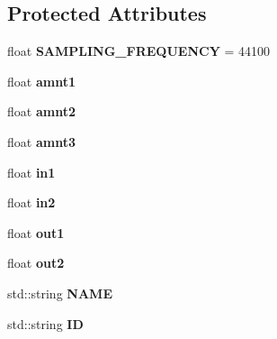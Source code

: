 \subsection*{Protected Attributes}
\begin{DoxyCompactItemize}
\item 
float {\bfseries S\+A\+M\+P\+L\+I\+N\+G\+\_\+\+F\+R\+E\+Q\+U\+E\+N\+CY} = 44100\hypertarget{classunit_1_1UGen_af570ad383b680b2c79209b6ab28d010d}{}\label{classunit_1_1UGen_af570ad383b680b2c79209b6ab28d010d}

\item 
float {\bfseries amnt1}\hypertarget{classunit_1_1UGen_a4691cf88e3711c22617c11fc3ea3848e}{}\label{classunit_1_1UGen_a4691cf88e3711c22617c11fc3ea3848e}

\item 
float {\bfseries amnt2}\hypertarget{classunit_1_1UGen_a5e71a2e764029b4909c7e8535922e4b3}{}\label{classunit_1_1UGen_a5e71a2e764029b4909c7e8535922e4b3}

\item 
float {\bfseries amnt3}\hypertarget{classunit_1_1UGen_a14ebb8261a700f961c2d7808609470fe}{}\label{classunit_1_1UGen_a14ebb8261a700f961c2d7808609470fe}

\item 
float {\bfseries in1}\hypertarget{classunit_1_1UGen_aaf1873ae9668c6f1b37cae635bd40037}{}\label{classunit_1_1UGen_aaf1873ae9668c6f1b37cae635bd40037}

\item 
float {\bfseries in2}\hypertarget{classunit_1_1UGen_aed559bb431c46fe308560bd81756d169}{}\label{classunit_1_1UGen_aed559bb431c46fe308560bd81756d169}

\item 
float {\bfseries out1}\hypertarget{classunit_1_1UGen_a90ba3b9008a6d8386035db3dee502217}{}\label{classunit_1_1UGen_a90ba3b9008a6d8386035db3dee502217}

\item 
float {\bfseries out2}\hypertarget{classunit_1_1UGen_a779961bf3971a9f4c85d292dbb6d6d78}{}\label{classunit_1_1UGen_a779961bf3971a9f4c85d292dbb6d6d78}

\item 
std\+::string {\bfseries N\+A\+ME}\hypertarget{classunit_1_1UGen_ae468f7e763da88da4389b8bdbc306459}{}\label{classunit_1_1UGen_ae468f7e763da88da4389b8bdbc306459}

\item 
std\+::string {\bfseries ID}\hypertarget{classunit_1_1UGen_ab8d5acd179e175cc787ac43a49b68c29}{}\label{classunit_1_1UGen_ab8d5acd179e175cc787ac43a49b68c29}

\end{DoxyCompactItemize}


